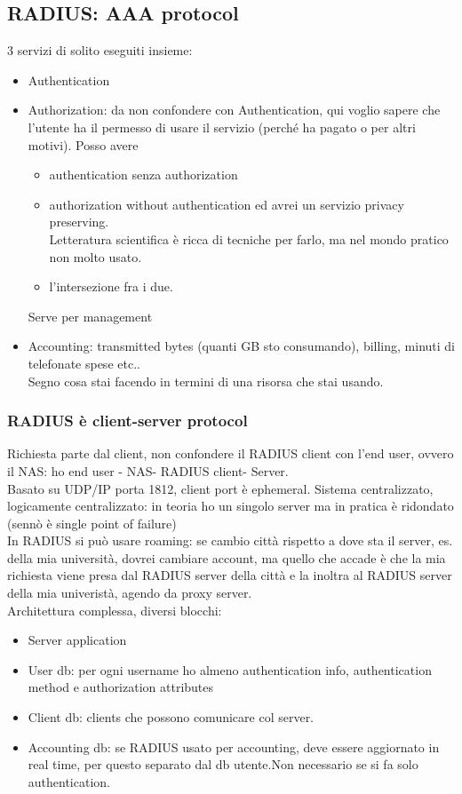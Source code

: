 \documentclass[16px]{article}
\begin{document}
\subsection{RADIUS: AAA protocol}
3 servizi di solito eseguiti insieme:
\begin{itemize}
\item Authentication
\item Authorization: da non confondere con Authentication, qui voglio sapere che l'utente ha il permesso di usare il servizio (perché ha pagato o per altri motivi).
Posso avere 
\begin{itemize}
\item authentication senza authorization
\item authorization without authentication ed avrei un servizio privacy preserving.\\Letteratura scientifica è ricca di tecniche per farlo, ma nel mondo pratico non molto usato.
\item l'intersezione fra i due.
\end{itemize}
Serve per management
\item Accounting: transmitted bytes (quanti GB sto consumando), billing, minuti di telefonate spese etc..\\Segno cosa stai facendo in termini di una risorsa che stai usando.
\end{itemize}
\subsubsection{RADIUS è client-server protocol}
Richiesta parte dal client, non confondere il RADIUS client con l'end user, ovvero il NAS: ho end user - NAS- RADIUS client- Server.\\Basato su UDP/IP porta 1812, client port è ephemeral. Sistema centralizzato, logicamente centralizzato: in teoria ho un singolo server ma in pratica è ridondato (sennò è single point of failure)\\In RADIUS si può usare roaming: se cambio città rispetto a dove sta il server, es. della mia università, dovrei cambiare account, ma quello che accade è che la mia richiesta viene presa dal RADIUS server della città e la inoltra al RADIUS server della mia univeristà, agendo da proxy server.\\Architettura complessa, diversi blocchi:
\begin{itemize}
\item Server application
\item User db: per ogni username ho almeno authentication info, authentication method e authorization attributes
\item Client db: clients che possono comunicare col server.
\item  Accounting db: se RADIUS usato per accounting, deve essere aggiornato in real time, per questo separato dal db utente.Non necessario se si fa solo authentication.
\end{itemize}
\end{document}
